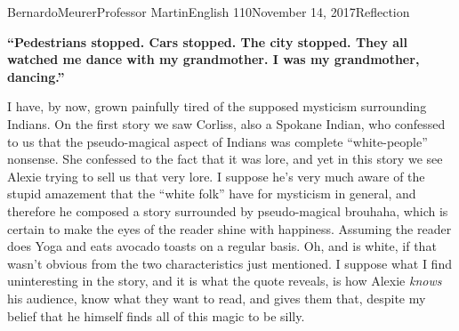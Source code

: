 \documentclass[12pt,letterpaper]{article}
\begin{document}
    \begin{mla}{Bernardo}{Meurer}{Professor Martin}{English 110}{November 14, 2017}{Reflection}
    \begin{singlespace}
        \textbf{``Pedestrians stopped. Cars stopped. The city stopped. They all watched me dance with my grandmother. I was my grandmother, dancing.''}
    \end{singlespace}

    I have, by now, grown painfully tired of the supposed mysticism surrounding Indians. On the first story we saw Corliss, also a Spokane Indian, who confessed to us that the pseudo-magical aspect of Indians was complete ``white-people'' nonsense. She confessed to the fact that it was lore, and yet in this story we see Alexie trying to sell us that very lore. I suppose he's very much aware of the stupid amazement that the ``white folk'' have for mysticism in general, and therefore he composed a story surrounded by pseudo-magical brouhaha, which is certain to make the eyes of the reader shine with happiness. Assuming the reader does Yoga and eats avocado toasts on a regular basis. Oh, and is white, if that wasn't obvious from the two characteristics just mentioned. I suppose what I find uninteresting in the story, and it is what the quote reveals, is how Alexie \emph{knows} his audience, know what they want to read, and gives them that, despite my belief that he himself finds all of this magic to be silly.

    \end{mla}
    
\end{document}
